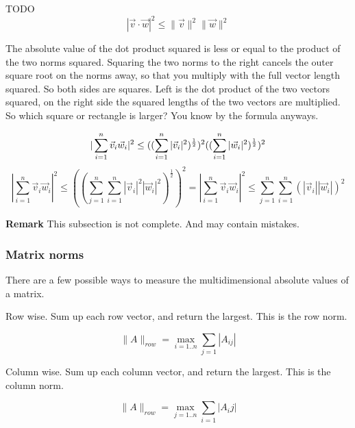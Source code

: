 \documentclass[a4paper]{article}
\begin{document}
TODO\\

\begin{displaymath}
    |\vec{v}\cdot\vec{w}|^{2} \leq \|\vec{v}\|^{2}\|\vec{w}\|^{2}
\end{displaymath}

The absolute value of the dot product squared is less or equal to the product of the two norms squared. Squaring the two norms to the right cancels the outer square root on the norms away, so that you multiply with the full vector length squared. So both sides are squares. Left is the dot product of the two vectors squared, on the right side the squared lengths of the two vectors are multiplied. So which square or rectangle is larger? You know by the formula anyways.

\begin{displaymath}
    |\sum_{i=1}^{n}\vec{v}_{i}\vec{w}_{i}|^{2} \leq ((\sum_{i=1}^{n}|\vec{v}_{i}|^{2})^{\frac{1}{2}})^{2}((\sum_{i=1}^{n}|\vec{w}_{i}|^{2})^{\frac{1}{2}})^{2}\\
\end{displaymath}
\begin{displaymath}
|\sum_{i=1}^{n}\vec{v}_{i}\vec{w}_{i}|^{2} \leq ((\sum_{j=1}^{n}\sum_{i=1}^{n}|\vec{v}_{i}|^{2}|\vec{w}_{i}|^{2})^{\frac{1}{2}})^{2} 
=
|\sum_{i=1}^{n}\vec{v}_{i}\vec{w}_{i}|^{2} \leq \sum_{j=1}^{n}\sum_{i=1}^{n}(|\vec{v}_{i}||\vec{w}_{i}|)^{2}
\end{displaymath}

\textbf{Remark} This subsection is not complete. And may contain mistakes.

\subsubsection{Matrix norms}

There are a few possible ways to measure the multidimensional absolute values of a matrix.

Row wise. Sum up each row vector, and return the largest. This is the row norm.

\begin{displaymath}
\|A\|_{row} = \max_{i=1..n} { \sum_{j=1} |A_{ij}| }
\end{displaymath}

Column wise. Sum up each column vector, and return the largest. This is the column norm.


\begin{displaymath}
\|A\|_{row} = \max_{j=1..n} { \sum_{i=1} |A_{i}j| }
\end{displaymath}
\end{document}
